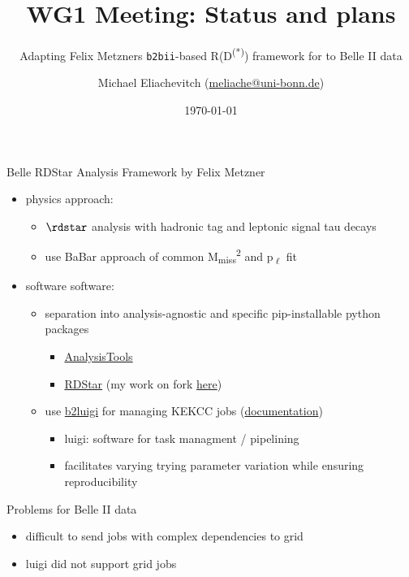 \documentclass[aspectratio=169, 12pt]{beamer}
\author{Michael Eliachevitch (\href{mailto:meliache@uni-bonn.de}{meliache@uni-bonn.de})}
\date{\today}
\title{WG1 Meeting: Status and plans}
\subtitle{Adapting Felix Metzners \texttt{b2bii}-based R(D\textsuperscript{(*)}) framework for to Belle II data}
\institute{Physikalisches Institut --- Rheinische Friedrich-Wilhelms-Universität Bonn}
\begin{document}
\maketitle


\begin{frame}[label={sec:orgc132c2e}]{Belle RDStar Analysis Framework by Felix Metzner}
\begin{itemize}
\item \alert{\alert{physics approach:}}
\begin{itemize}
\item \(\rdstar\) analysis with hadronic tag and leptonic signal tau decays
\item use BaBar approach of common M\textsubscript{miss}\textsuperscript{2} and p\textsubscript{\(\ell\)} fit
\end{itemize}
\item \alert{\alert{software software:}}
\begin{itemize}
\item separation into analysis-agnostic and specific pip-installable python packages
\begin{itemize}
\item \href{https://gitlab.etp.kit.edu/fmetzner/AnalysisTools}{AnalysisTools}
\item \href{https://gitlab.etp.kit.edu/fmetzner/RDStar}{RDStar} (my work on fork \href{https://gitlab.etp.kit.edu/meliachevitch/RDStar}{here})
\end{itemize}
\item use \href{https://github.com/nils-braun/b2luigi}{b2luigi} for managing KEKCC
jobs (\href{https://b2luigi.readthedocs.io/en/stable/}{documentation})
\begin{itemize}
\item luigi: software for task managment / pipelining
\item facilitates varying trying parameter variation while ensuring reproducibility
\end{itemize}
\end{itemize}
\end{itemize}
\begin{block}{Problems for Belle II data}
\begin{itemize}
\item difficult to send jobs with complex dependencies to grid
\item luigi did not support grid jobs
\end{itemize}
\end{block}
\end{frame}
\end{document}
